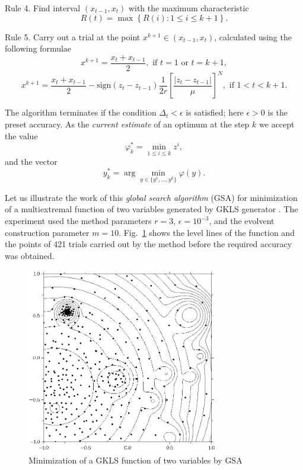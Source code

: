 \documentclass{llncs}
\begin{document}
Rule 4. Find interval $(x_{t-1},x_t)$ with the maximum characteristic
\begin{equation}\label{eq:141}
R(t)=\max{\left\{R(i): 1 \leq i \leq k+1\right\}}.
\end{equation}

Rule 5. Carry out a trial at the point $x^{k+1}\in(x_{t-1},x_t)$, calculated using the following formulae
\[
x^{k+1} = \frac{x_t+x_{t-1}}{2}, \textrm{ if } t=1 \textrm{ or } t=k+1,
\]
\begin{equation}\label{eq:142}
x^{k+1} = \frac{x_t+x_{t-1}}{2} - \mathrm{sign}(z_t-z_{t-1})\frac{1}{2r}\left[\frac{\left|z_t-z_{t-1}\right|}{\mu}\right]^N, \textrm{ if } 1<t<k+1.
\end{equation}

The algorithm terminates if the condition $\Delta_t<\epsilon$ is satisfied; here $\epsilon>0$ is the preset accuracy. As the \textit{current estimate} of an optimum at the step $k$ we accept the value 
\begin{equation}\label{eq:phistar}
\varphi_k^\ast=\min_{1\leq i \leq k}z^i,
\end{equation}
and the vector 
\[
y_k^\ast=\arg \min_{y \in \{ y^1,...,y^k\} }\varphi(y).
\]

Let us illustrate the work of this \textit{global search algorithm} (GSA) for minimization of a multiextremal function of two variables generated by GKLS generator \cite{Gaviano}. %
The experiment used the method parameters $r=3$, $\epsilon=10^{-3}$, and the evolvent construction parameter $m=10$. Fig.~\ref{fig:1} shows the level lines of the function and the points of 421 trials carried out by the method before the required accuracy was obtained.
\begin{figure}
	\center
  \includegraphics[width=0.75\textwidth]{fig2.jpg} 
  \caption{Minimization of a GKLS function of two variables by GSA}
  \label{fig:1}       %
\end{figure} 
\end{document}
